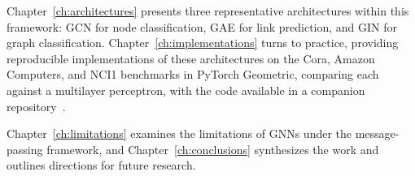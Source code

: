 Chapter~\ref{ch:architectures} presents three representative architectures
within this framework: GCN for node classification, GAE for link prediction,
and GIN for graph classification. Chapter~\ref{ch:implementations} turns to
practice, providing reproducible implementations of these architectures on the
Cora, Amazon Computers, and NCI1 benchmarks in PyTorch Geometric, comparing each
against a multilayer perceptron, with the code available
in a companion repository~\cite{macias2026}.

Chapter~\ref{ch:limitations} examines the limitations of GNNs under the
message-passing framework, and Chapter~\ref{ch:conclusions} synthesizes the
work and outlines directions for future research.

